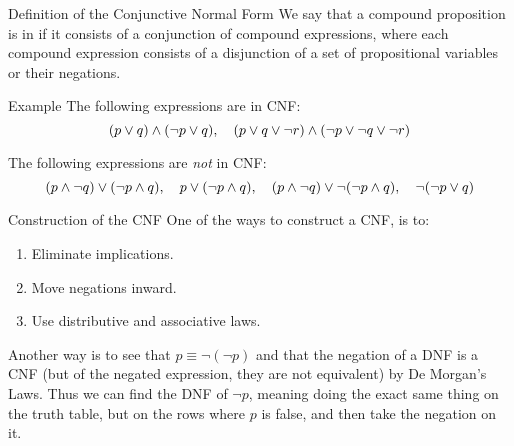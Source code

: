 \documentclass{article}
\begin{document}
\begin{parag}{Definition of the Conjunctive Normal Form}
    We say that a compound proposition is in  if it consists of a conjunction of compound expressions, where each compound expression consists of a disjunction of a set of propositional variables or their negations.
\end{parag}

\begin{parag}{Example}
    The following expressions are in CNF: 
    \[\left(p \lor q\right) \land \left(\lnot p \lor q\right), \mathspace \left(p \lor q \lor \lnot r\right) \land\left(\lnot p \lor \lnot q \lor \lnot r\right)\]

    The following expressions are \textit{not} in CNF:
    \[\left(p \land \lnot q\right) \lor \left(\lnot p \land q\right), \mathspace p \lor \left(\lnot p \land q\right), \mathspace \left(p \land\lnot q\right) \lor \lnot\left(\lnot p \land q\right), \mathspace \lnot\left(\lnot p \lor q\right)\]
    
\end{parag}

\begin{parag}{Construction of the CNF}
    One of the ways to construct a CNF, is to:
    \begin{enumerate}
        \item Eliminate implications.
        \item Move negations inward.
        \item Use distributive and associative laws.
    \end{enumerate}
    
    Another way is to see that $p \equiv \lnot\left(\lnot p\right)$ and that the negation of a DNF is a CNF (but of the negated expression, they are not equivalent) by De Morgan's Laws. Thus we can find the DNF of $\lnot p$, meaning doing the exact same thing on the truth table, but on the rows where $p$ is false, and then take the negation on it. 
\end{parag}
\end{document}
